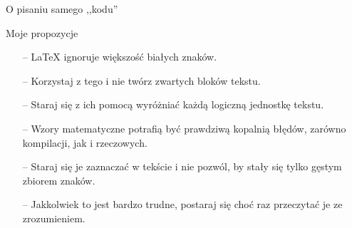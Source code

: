 \documentclass{beamer}
\begin{document}
\begin{frame}{O pisaniu samego ,,kodu''}
\pause

\begin{block}{Moje propozycje}

\begin{itemize}
\pause
\item[--] \LaTeX { }ignoruje większość białych znaków.
\pause
\item[--] Korzystaj z tego i nie twórz zwartych bloków tekstu.
\pause
\item[--] Staraj się z ich pomocą wyróżniać każdą logiczną jednostkę tekstu.
\pause
\item[--] Wzory matematyczne potrafią być prawdziwą kopalnią błędów, zarówno kompilacji, jak i rzeczowych. 
\pause
\item[--]Staraj się je zaznaczać w tekście i nie pozwól, by stały się tylko gęstym zbiorem znaków.
\pause
\item[--] Jakkolwiek to jest bardzo trudne, postaraj się choć raz przeczytać je ze zrozumieniem.
\end{itemize}

\end{block}

\end{frame}
%
%
%
%
%
%
%
%
%
%
\end{document}
